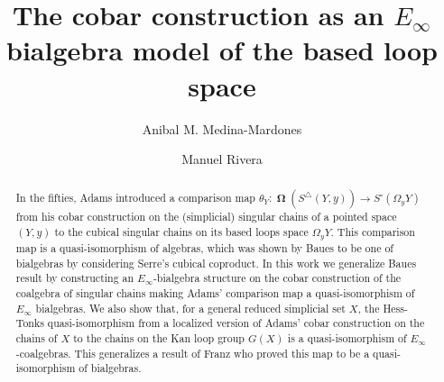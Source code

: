 \documentclass{amsart}
\DeclareMathOperator{\cobar}{\mathbf{\Omega}}
\theoremstyle{definition}
\begin{document}
\title{The cobar construction as an $E_\infty$ bialgebra model of the based loop space}
\author{Anibal M. Medina-Mardones}
\address{Max Plank Institute for Mathematics, Bonn, Germany}
\address{Department of Mathematics, University of Notre Dame, Notre Dame, IN, USA}
\author{Manuel Rivera}
\address{Purdue University}


\begin{abstract}
    In the fifties, Adams introduced a comparison map $\theta_Y \colon \cobar(S^\triangle(Y,y)) \to S^\square(\Omega_y Y)$ from his cobar construction on the (simplicial) singular chains of a pointed space $(Y, y)$ to the cubical singular chains on its based loops space $\Omega_y Y$.
	This comparison map is a quasi-isomorphism of algebras, which was shown by Baues to be one of bialgebras by considering Serre's cubical coproduct.
	In this work we generalize Baues result by constructing an $E_{\infty}$-bialgebra structure on the cobar construction of the coalgebra of singular chains making Adams' comparison map a quasi-isomorphism of $E_\infty$ bialgebras.
	We also show that, for a general reduced simplicial set $X$, the Hess-Tonks quasi-isomorphism from a localized version of Adams' cobar construction on the chains of $X$ to the chains on the Kan loop group $G(X)$ is a quasi-isomorphism of $E_\infty$-coalgebras.
	This generalizes a result of Franz who proved this map to be a quasi-isomorphism of bialgebras.
\end{abstract}

\vspace*{-1cm}

\maketitle
\setcounter{tocdepth}{1}
\tableofcontents








\end{document}

